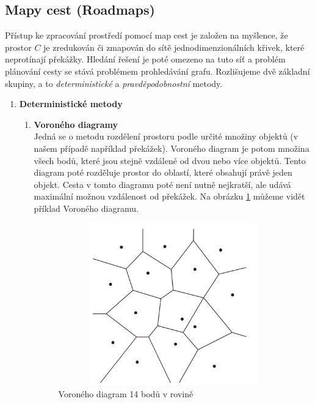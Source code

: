 \subsection{Mapy cest (Roadmaps)}
Přístup ke zpracování prostředí pomocí map cest je založen na myšlence, že prostor $C$ je zredukován či zmapován do sítě jednodimenzionálních křivek, které neprotínají překážky. Hledání řešení je poté omezeno na tuto síť a problém plánování cesty se stává problémem prohledávání grafu. Rozlišujeme dvě základní skupiny, a to \textit{deterministické} a \textit{pravděpodobnostní} metody.
\begin{enumerate}
	\item \textbf{Deterministické metody}
	\begin{enumerate}
		\item \textbf{Voroného diagramy}\\
		Jedná se o metodu rozdělení prostoru podle určité množiny objektů (v našem případě například překážek). Voroného diagram je potom množina všech bodů, které jsou stejně vzdálené od dvou nebo více objektů. Tento diagram poté rozděluje prostor do oblastí, které obsahují právě jeden objekt. Cesta v tomto diagramu poté není nutně nejkratší, ale udává maximální možnou vzdálenost od překážek. \cite{Yan20130104,Opfer20111202} Na obrázku \ref{obr:voronoi} můžeme vidět příklad Voroného diagramu.
		\begin{figure}[h!]
			\begin{center}
				\includegraphics*[width=15cm,height=7cm,keepaspectratio]{obr/voronoi}
			\end{center}
			\caption{Voroného diagram 14 bodů v rovině \cite{Opfer20111202}}
			\label{obr:voronoi}
		\end{figure}
	

\end{enumerate}
\end{enumerate}
